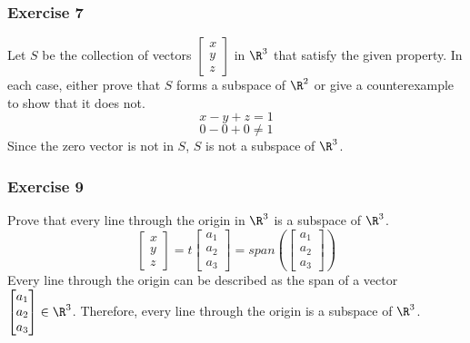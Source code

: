 \documentclass[letterpaper, 12pt]{math}
\begin{document}
\subsubsection*{Exercise 7}
Let \( S \) be the collection of vectors \( \begin{bmatrix}x \\ y \\ z
\end{bmatrix} \) in \( \R^3 \) that satisfy the given property. In each case,
either prove that \( S \) forms a subspace of \( \R^2 \) or give a
counterexample to show that it does not.
\[ x-y+z = 1 \]
\[ 0-0+0 \ne 1 \]
Since the zero vector is not in \( S \), \( S \) is not a subspace of
\( \R^3 \).

\subsubsection*{Exercise 9}
Prove that every line through the origin in \( \R^3 \) is a subspace of
\( \R^3 \).
\[ \begin{bmatrix}x \\ y \\ z\end{bmatrix} =
  t\begin{bmatrix}a_1 \\ a_2 \\ a_3\end{bmatrix} =
  span\left(\begin{bmatrix}a_1 \\ a_2 \\ a_3\end{bmatrix}\right) \]
Every line through the origin can be described as the span of a vector
\( \begin{bmatrix}a_1 \\ a_2 \\ a_3\end{bmatrix}\in\R^3 \). Therefore, every
line through the origin is a subspace of \( \R^3 \).
\end{document}
